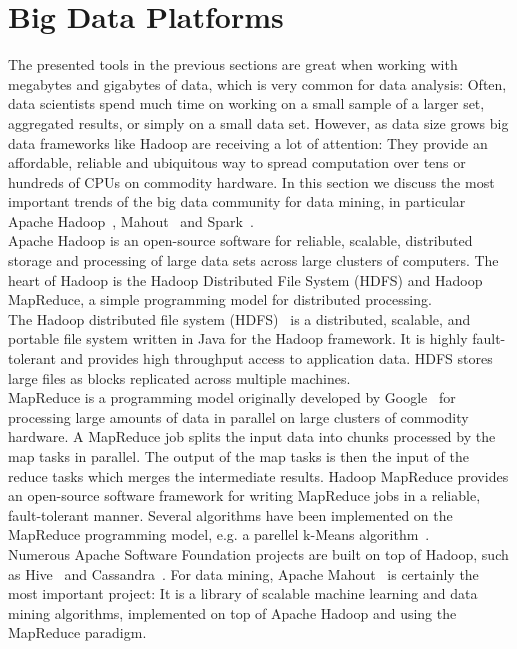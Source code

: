 \section{Big Data Platforms}
The presented tools in the previous sections are great when working with megabytes and gigabytes of data, which is very common for data analysis: Often, data scientists spend much time on working on a small sample of a larger set, aggregated results, or simply on a small data set. However, as data size grows big data frameworks like Hadoop are receiving a lot of attention: They provide an affordable, reliable and ubiquitous way to spread computation over tens or hundreds of CPUs on commodity hardware. In this section we discuss the most important trends of the big data community for data mining, in particular Apache Hadoop~\parencite{hadoop}, Mahout~\parencite{mahout} and Spark~\parencite{spark}.
\\
Apache Hadoop is an open-source software for reliable, scalable, distributed storage and processing of large data sets across large clusters of computers. The heart of Hadoop is the Hadoop Distributed File System (HDFS) and Hadoop MapReduce, a simple programming model for distributed processing. 
\\
The Hadoop distributed file system (HDFS)~\parencite{hdfs} is a distributed, scalable, and portable file system written in Java for the Hadoop framework. It is highly fault-tolerant and provides high throughput access to application data. HDFS stores large files as blocks replicated across multiple machines.
\\
MapReduce is a programming model originally developed by Google~\parencite{mapreduce} for processing large amounts of data in parallel on large clusters of commodity hardware. A MapReduce job splits the input data into chunks processed by the map tasks in parallel. The output of the map tasks is then the input of the reduce tasks which merges the intermediate results. Hadoop MapReduce provides an open-source software framework for writing MapReduce jobs in a reliable, fault-tolerant manner. 
Several algorithms have been implemented on the MapReduce programming model, e.g. a parellel k-Means algorithm~\parencite{parallelkmeans}. 
\\
Numerous Apache Software Foundation projects are built on top of Hadoop, such as Hive~\parencite{hive} and Cassandra~\parencite{cassandra}. For data mining, Apache Mahout~\parencite{mahout} is certainly the most important project: It is a library of scalable machine learning and data mining algorithms, implemented on top of Apache Hadoop and using the MapReduce paradigm. 
